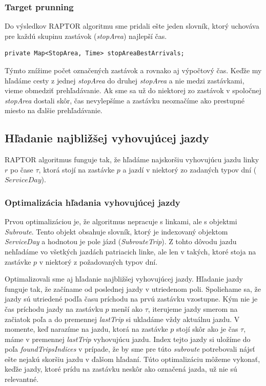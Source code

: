 \subsubsection{Target prunning}
Do výsledkov RAPTOR algoritmu sme pridali ešte jeden slovník, ktorý uchováva pre každú skupinu zastávok (\textit{stopArea}) najlepší čas. 
\begin{lstlisting}
private Map<StopArea, Time> stopAreaBestArrivals;
\end{lstlisting}
Týmto znížime počet označených zastávok a rovnako aj výpočtový čas. Keďže my hľadáme cesty z jednej \textit{stopArea} do druhej \textit{stopArea} a nie medzi zastávkami, vieme obmedziť prehľadávanie. Ak sme sa už do niektorej zo zastávok v spoločnej \textit{stopArea} dostali skôr, čas nevylepšíme a zastávku neoznačíme ako prestupné miesto na ďalšie prehľadávanie. 

\subsection{Hľadanie najbližšej vyhovujúcej jazdy}
RAPTOR algoritmus funguje tak, že hľadáme najskoršiu vyhovujúcu jazdu linky $r$ po čase $\tau$, ktorá stojí na zastávke $p$ a jazdí v niektorý zo zadaných typov dní ($ServiceDay$). 

\subsubsection{Optimalizácia hľadania vyhovujúcej jazdy}
\label{sec:trip-finding}
Prvou optimalizáciou je, že algoritmus nepracuje s linkami, ale s objektmi \textit{Subroute}. Tento objekt obsahuje slovník, ktorý je indexovaný objektom \textit{ServiceDay} a hodnotou je pole jázd (\textit{SubrouteTrip}). Z tohto dôvodu jazdu nehľadáme vo všetkých jazdách patriacich linke, ale len v takých, ktoré stoja na zastávke $p$ v niektorý z požadovaných typov dní. 

Optimalizovali sme aj hľadanie najbližšej vyhovujúcej jazdy. Hľadanie jazdy funguje tak, že začíname od poslednej jazdy v utriedenom poli. Spoliehame sa, že jazdy sú utriedené podľa času príchodu na prvú zastávku vzostupne. Kým nie je čas príchodu jazdy na zastávku $p$ menší ako $\tau$, iterujeme jazdy smerom na začiatok poľa a do premennej \textit{lastTrip} si ukladáme vždy aktuálnu jazdu. V momente, keď narazíme na jazdu, ktorá na zastávke $p$ stojí skôr ako je čas $\tau$, máme v premennej \textit{lastTrip} vyhovujúcu jazdu. Index tejto jazdy si uložíme do poľa \textit{foundTripsIndices} v prípade, že by sme pre túto \textit{subroute} potrebovali nájsť ešte nejakú skoršiu jazdu v ďalšom hľadaní. Túto optimalizáciu môžeme vykonať, keďže jazdy, ktoré prídu na zastávku neskôr ako označená jazda, už nie sú relevantné.

